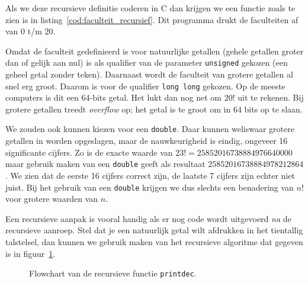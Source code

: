 Als we deze recursieve definitie coderen in C dan krijgen we een functie zoals te zien is in listing~\ref{cod:faculteit_recursief}. Dit programma drukt de faculteiten af van $0$ t/m $20$.


Omdat de faculteit gedefinieerd is voor natuurlijke getallen (gehele getallen groter dan of gelijk aan nul) is als qualifier van de parameter \texttt{unsigned} gekozen (een geheel getal zonder teken). Daarnaast wordt de faculteit van grotere getallen al snel erg groot. Daarom is voor de qualifier \texttt{long long} gekozen. Op de meeste computers is dit een 64-bits getal. Het lukt dan nog net om $20!$ uit te rekenen. Bij grotere getallen treedt \textsl{overflow} op; het getal is te groot om in 64 bits op te slaan.

We zouden ook kunnen kiezen voor een \texttt{double}. Daar kunnen weliswaar grotere getallen in worden opgeslagen, maar de nauwkeurigheid is eindig, ongeveer 16 significante cijfers.
Zo is de exacte waarde van $23! = 25852016738884976640000$ maar gebruik maken van een \texttt{double} geeft als resultaat $25852016738884978212864$. We zien dat de eerste 16 cijfers correct zijn, de laatste 7 cijfers zijn echter niet juist. Bij het gebruik van een \texttt{double} krijgen we dus slechts een benadering van $n!$ voor grotere waarden van $n$.  

Een recursieve aanpak is vooral handig als er nog code wordt uitgevoerd \emph{na} de recursieve aanroep.
Stel dat je een natuurlijk getal wilt afdrukken in het tientallig talstelsel, dan kunnen we gebruik maken van het recursieve algoritme dat gegeven is in figuur~\ref{fig:funprintdec}.

\begin{figure}[!ht]
\centering
{}
\caption{Flowchart van de recursieve functie \texttt{printdec}.}
\label{fig:funprintdec}
\end{figure}


